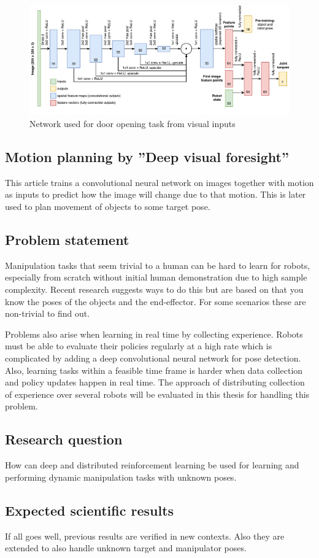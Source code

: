 \begin{figure}[h]
    \centering
    \includegraphics[width = 1.0\textwidth]{res/gps-net.pdf}
    \caption{Network used for door opening task from visual inputs \cite{chebotar2016path}}
    \label{fig:gps_net}
\end{figure}

\subsection{Motion planning by ''Deep visual foresight''}

This article \cite{finn2016deep} trains a convolutional neural network on
images together with motion as inputs to predict how the image will change due
to that motion. This is later used to plan movement of objects to some target
pose.

\subsection{Problem statement}

Manipulation tasks that seem trivial to a human can be hard to learn for
robots, especially from scratch without initial human demonstration due to high
sample complexity. Recent research suggests ways to do this but are based on
that you know the poses of the objects and the end-effector. For some scenarios
these are non-trivial to find out.

Problems also arise when learning in real time by collecting experience. Robots
must be able to evaluate their policies regularly at a high rate which is
complicated by adding a deep convolutional neural network for pose detection.
Also, learning tasks within a feasible time frame is harder when data
collection and policy updates happen in real time. The approach of
distributing collection of experience over several robots will be evaluated in
this thesis for handling this problem.

\subsection{Research question}

How can deep and distributed reinforcement learning be used for learning and
performing dynamic manipulation tasks with unknown poses.

\subsection{Expected scientific results}

If all goes well, previous results are verified in new contexts. Also
they are extended to also handle unknown target and manipulator poses.
